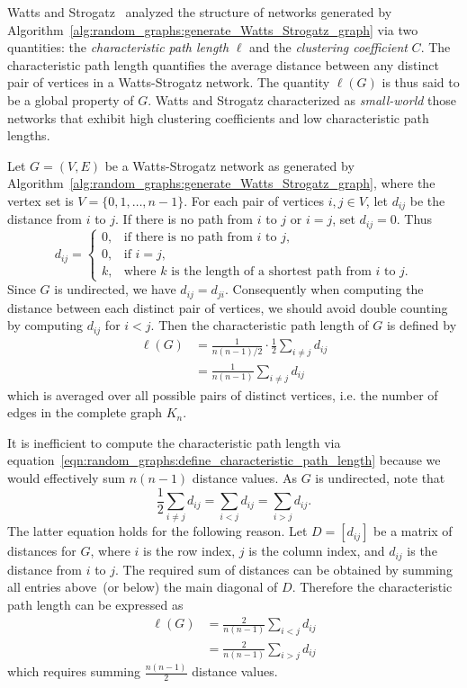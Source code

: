 Watts and Strogatz~\cite{WattsStrogatz1998} analyzed the structure of
networks generated by
Algorithm~\ref{alg:random_graphs:generate_Watts_Strogatz_graph} via
two quantities: the
\emph{characteristic path length}
$\ell$ and the
\emph{clustering coefficient}
$C$. The characteristic path length quantifies the average distance
between any distinct pair of vertices in a Watts-Strogatz network. The
quantity $\ell(G)$ is thus said to be a global property of $G$. Watts
and Strogatz characterized as \emph{small-world}
those networks that exhibit high clustering coefficients and low
characteristic path lengths.

Let $G = (V,E)$ be a Watts-Strogatz network as generated by
Algorithm~\ref{alg:random_graphs:generate_Watts_Strogatz_graph}, where
the vertex set is $V = \{0, 1, \dots, n-1\}$. For each pair of
vertices $i,j \in V$, let $d_{ij}$ be the distance from $i$ to $j$. If
there is no path from $i$ to $j$ or $i = j$, set $d_{ij} = 0$. Thus
\[
d_{ij}
=
\begin{cases}
0, & \text{if there is no path from $i$ to $j$}, \\[4pt]
0, & \text{if $i = j$}, \\[4pt]
k, & \text{where $k$ is the length of a shortest path from $i$ to $j$}.
\end{cases}
\]
Since $G$ is undirected, we have $d_{ij} = d_{ji}$. Consequently when
computing the distance between each distinct pair of vertices, we
should avoid double counting by computing $d_{ij}$ for $i < j$. Then
the characteristic path length of $G$ is defined by
\begin{equation}
\label{eqn:random_graphs:define_characteristic_path_length}
\begin{aligned}
\ell(G)
&=
\frac{1}{n(n-1)/2} \cdot \frac{1}{2} \sum_{i \neq j} d_{ij} \\[4pt]
&=
\frac{1}{n(n-1)} \sum_{i \neq j} d_{ij}
\end{aligned}
\end{equation}
which is averaged over all possible pairs of distinct vertices,
i.e. the number of edges in the complete graph
$K_n$.

It is inefficient to compute the characteristic path length via
equation~\eqref{eqn:random_graphs:define_characteristic_path_length}
because we would effectively sum $n(n - 1)$ distance values. As $G$ is
undirected, note that
\[
\frac{1}{2} \sum_{i \neq j} d_{ij}
=
\sum_{i < j} d_{ij}
=
\sum_{i > j} d_{ij}.
\]
The latter equation holds for the following reason. Let $D = [d_{ij}]$
be a matrix of distances for $G$, where $i$ is the row index, $j$ is
the column index, and $d_{ij}$ is the distance from $i$ to $j$. The
required sum of distances can be obtained by summing all entries
above~(or below) the main diagonal of $D$. Therefore the
characteristic path length can be expressed as
\begin{align*}
\ell(G)
&=
\frac{2}{n(n-1)} \sum_{i < j} d_{ij} \\[4pt]
&=
\frac{2}{n(n-1)} \sum_{i > j} d_{ij}
\end{align*}
which requires summing $\frac{n(n-1)}{2}$ distance values.

